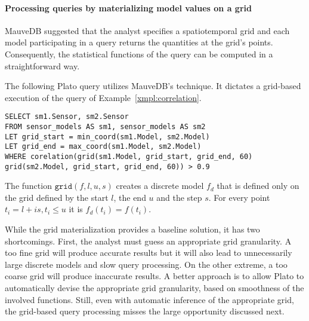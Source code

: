 \paragraph{Processing queries by materializing model values on a grid}
MauveDB  suggested that the analyst specifies a spatiotemporal grid and each model participating in a query returns the quantities at the grid's points. Consequently, the statistical functions of the query can be computed in a straightforward way. 

\vspace*{0.5cm}
\begin{example}
The following Plato query utilizes MauveDB's technique. It dictates a grid-based execution of the query of Example~\ref{xmpl:correlation}.
\begin{tabbing}
\texttt{SELECT sm1.Sensor, sm2.Sensor}\\
\texttt{FROM sensor\_models AS sm1, sensor\_models AS sm2}\\
\texttt{LET grid\_start = min\_coord(sm1.Model, sm2.Model)}\\
\texttt{LET grid\_end = max\_coord(sm1.Model, sm2.Model)}\\
\texttt{WHERE corelation(}\=\texttt{grid(sm1.Model, grid\_start, grid\_end, 60)}\\ \>\texttt{grid(sm2.Model, grid\_start, grid\_end, 60)) > 0.9}
\end{tabbing}
\noindent The function $\texttt{grid}(f, l, u, s)$ creates a discrete model $f_d$ that is defined only on the grid defined by the start $l$, the end $u$ and the step $s$.  For every point $t_i = l + is, t_i \leq u$ it is $f_d(t_i) = f(t_i)$.
\end{example}
\vspace*{0.5cm}

While the grid materialization provides a baseline solution, it has two shortcomings. First, the analyst must guess an appropriate grid granularity. A too fine grid will produce accurate results but it will also lead to unnecessarily large discrete models and slow query processing. On the other extreme, a too coarse grid will produce inaccurate results. A better approach is to allow Plato to automatically devise the appropriate grid granularity, based on smoothness of the involved functions.
Still, even with automatic inference of the appropriate grid, the grid-based query processing misses the large opportunity discussed next.\\

